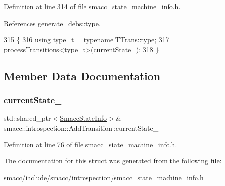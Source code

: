 Definition at line 314 of file smacc\+\_\+state\+\_\+machine\+\_\+info.\+h.



References generate\+\_\+debs\+::type.


\begin{DoxyCode}
315 \{
316     \textcolor{keyword}{using} type\_t = \textcolor{keyword}{typename} \hyperlink{namespacegenerate__debs_a50bc9a7ecac9584553e089a448bcde58}{TTrans::type};
317     processTransitions<type\_t>(\hyperlink{structsmacc_1_1introspection_1_1AddTransition_a56fd9b1bdf6761bbe5258dc915481f4b}{currentState\_});
318 \}
\end{DoxyCode}


\subsection{Member Data Documentation}
\mbox{\label{structsmacc_1_1introspection_1_1AddTransition_a56fd9b1bdf6761bbe5258dc915481f4b}} 
\subsubsection{\texorpdfstring{current\+State\+\_\+}{currentState\_}}
{\footnotesize\ttfamily std\+::shared\+\_\+ptr$<$\hyperlink{classsmacc_1_1introspection_1_1SmaccStateInfo}{Smacc\+State\+Info}$>$\& smacc\+::introspection\+::\+Add\+Transition\+::current\+State\+\_\+}



Definition at line 76 of file smacc\+\_\+state\+\_\+machine\+\_\+info.\+h.



The documentation for this struct was generated from the following file\+:\begin{DoxyCompactItemize}
\item 
smacc/include/smacc/introspection/\hyperlink{smacc__state__machine__info_8h}{smacc\+\_\+state\+\_\+machine\+\_\+info.\+h}\end{DoxyCompactItemize}
